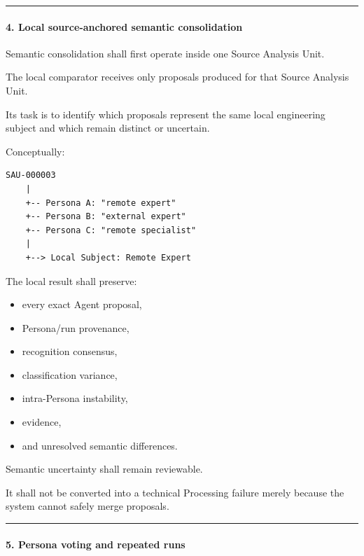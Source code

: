 \begin{center}\rule{0.5\linewidth}{0.5pt}\end{center}

\hypertarget{4-local-source-anchored-semantic-consolidation}{%
\paragraph{4. Local source-anchored semantic consolidation}\label{4-local-source-anchored-semantic-consolidation}}

Semantic consolidation shall first operate inside one Source Analysis Unit.

The local comparator receives only proposals produced for that Source Analysis Unit.

Its task is to identify which proposals represent the same local engineering subject and which remain distinct or uncertain.

Conceptually:

\begin{verbatim}
SAU-000003
    |
    +-- Persona A: "remote expert"
    +-- Persona B: "external expert"
    +-- Persona C: "remote specialist"
    |
    +--> Local Subject: Remote Expert
\end{verbatim}

The local result shall preserve:

\begin{itemize}
\tightlist
\item
  every exact Agent proposal,
\item
  Persona/run provenance,
\item
  recognition consensus,
\item
  classification variance,
\item
  intra-Persona instability,
\item
  evidence,
\item
  and unresolved semantic differences.
\end{itemize}

Semantic uncertainty shall remain reviewable.

It shall not be converted into a technical Processing failure merely because the system cannot safely merge proposals.

\begin{center}\rule{0.5\linewidth}{0.5pt}\end{center}

\hypertarget{5-persona-voting-and-repeated-runs}{%
\paragraph{5. Persona voting and repeated runs}\label{5-persona-voting-and-repeated-runs}}

